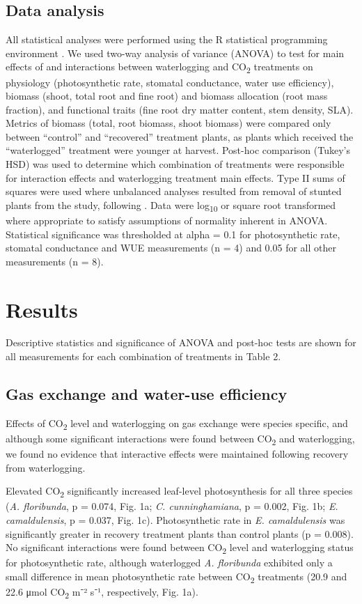 \documentclass[openright,12pt,a4paper]{memoir}
\begin{document}
\subsection*{Data analysis}
All statistical analyses were performed using the R statistical programming environment  \citep{RCoreTeam2015}. We used two-way analysis of variance (ANOVA) to test for main effects of and interactions between waterlogging and CO\textsubscript{2} treatments on physiology (photosynthetic rate, stomatal conductance, water use efficiency), biomass (shoot, total root and fine root) and biomass allocation (root mass fraction), and functional traits (fine root dry matter content, stem density, SLA). Metrics of biomass (total, root biomass, shoot biomass) were compared only between “control” and “recovered” treatment plants, as plants which received the “waterlogged” treatment were younger at harvest. Post-hoc comparison (Tukey’s HSD) was used to determine which combination of treatments were responsible for interaction effects and waterlogging treatment main effects. Type II sums of squares were used where unbalanced analyses resulted from removal of stunted plants from the study, following \citep{Lansgrud2003}. Data were log\textsubscript{10} or square root transformed where appropriate to satisfy assumptions of normality inherent in ANOVA. Statistical significance was thresholded at alpha = 0.1 for photosynthetic rate, stomatal conductance and WUE measurements (n = 4) and 0.05 for all other measurements (n = 8).

\section{Results}
Descriptive statistics and significance of ANOVA and post-hoc tests are shown for all measurements for each combination of treatments in Table 2. 

\subsection*{Gas exchange and water-use efficiency}
Effects of CO\textsubscript{2} level and waterlogging on gas exchange were species specific, and although some significant interactions were found between CO\textsubscript{2} and waterlogging, we found no evidence that interactive effects were maintained following recovery from waterlogging. 

Elevated CO\textsubscript{2} significantly increased leaf-level photosynthesis for all three species (\textit{A. floribunda}, p = 0.074, Fig. 1a; \textit{C. cunninghamiana}, p = 0.002, Fig. 1b; \textit{E. camaldulensis}, p = 0.037, Fig. 1c). Photosynthetic rate in \textit{E. camaldulensis} was significantly greater in recovery treatment plants than control plants (p = 0.008). No significant interactions were found between CO\textsubscript{2} level and waterlogging status for photosynthetic rate, although waterlogged \textit{A. floribunda} exhibited only a small difference in mean photosynthetic rate between CO\textsubscript{2} treatments (20.9 and 22.6 μmol CO\textsubscript{2} m⁻² s⁻¹, respectively, Fig. 1a).
\end{document}
